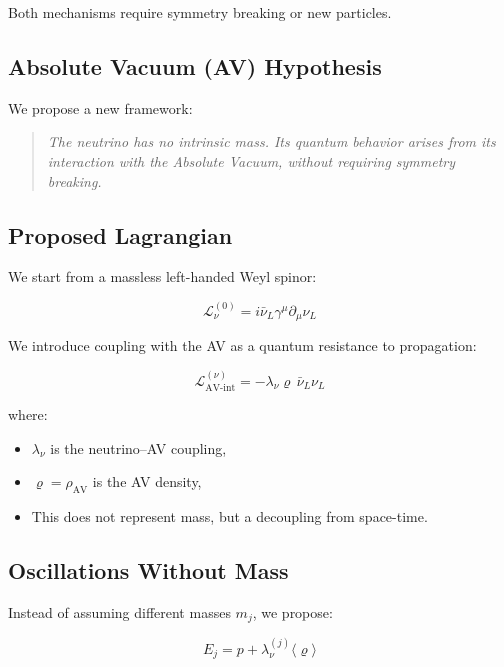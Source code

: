\documentclass[twoside]{article}
\theoremstyle{definition}
\theoremstyle{remark}
\numberwithin{equation}{section}
\theoremstyle{definition}
\theoremstyle{example}
\theoremstyle{remark}
\numberwithin{equation}{section}%
\begin{document}
	Both mechanisms require symmetry breaking or new particles.
	
	\subsection{Absolute Vacuum (AV) Hypothesis}
	
	We propose a new framework:
	
	\begin{quote}
		\textit{The neutrino has no intrinsic mass. Its quantum behavior arises from its interaction with the Absolute Vacuum, without requiring symmetry breaking.}
	\end{quote}
	
	\subsection{Proposed Lagrangian}
	
	We start from a massless left-handed Weyl spinor:
	
	\begin{equation}
		\mathcal{L}_{\nu}^{(0)} = i \bar{\nu}_L \gamma^\mu \partial_\mu \nu_L
	\end{equation}
	
	We introduce coupling with the AV as a quantum resistance to propagation:
	
	\begin{equation}
		\mathcal{L}_{\text{AV-int}}^{(\nu)} = - \lambda_{\nu} \varrho \, \bar{\nu}_L \nu_L
	\end{equation}
	
	where:
	\begin{itemize}
		\item \(\lambda_\nu\) is the neutrino–AV coupling,
		\item \(\varrho = \rho_{\text{AV}}\) is the AV density,
		\item This does not represent mass, but a decoupling from space-time.
	\end{itemize}
	
	\subsection{Oscillations Without Mass}
	
	Instead of assuming different masses \(m_j\), we propose:
	
	\begin{equation}
		E_j = p + \lambda_\nu^{(j)} \langle \varrho \rangle
	\end{equation}
	
\end{document}
